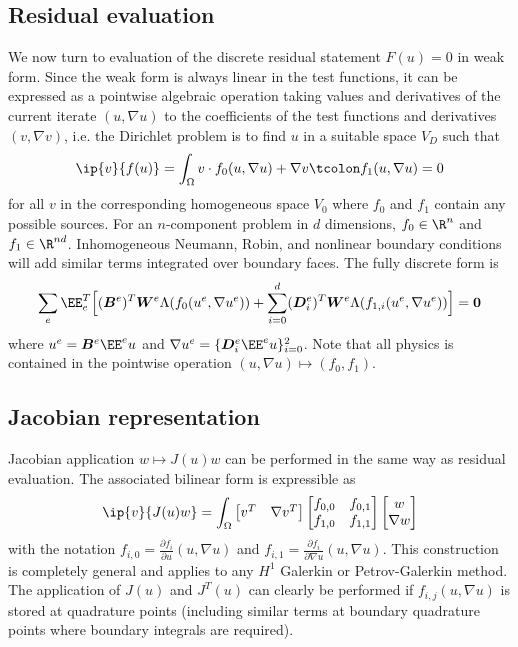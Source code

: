 \subsection{Residual evaluation}\label{sec:res-eval}
We now turn to evaluation of the discrete residual statement $F(u) = 0$ in weak form.  Since the weak form is always
linear in the test functions, it can be expressed as a pointwise algebraic operation taking values and derivatives of
the current iterate $(u,\nabla u)$ to the coefficients of the test functions and derivatives $(v,\nabla v)$, i.e. the
Dirichlet problem is to find $u$ in a suitable space $V_D$ such that
\begin{equation}\label{eq:feval}
  \ip{v}{f(u)} = \int_\Omega v \cdot f_0(u,\nabla u) + \nabla v \tcolon f_1(u,\nabla u) = 0
\end{equation}
for all $v$ in the corresponding homogeneous space $V_0$ where $f_0$ and $f_1$ contain any possible sources.  For an
$n$-component problem in $d$ dimensions, $f_0 \in \R^n$ and $f_1 \in \R^{nd}$.  Inhomogeneous Neumann, Robin, and
nonlinear boundary conditions will add similar terms integrated over boundary faces.  The fully discrete form is
\begin{equation}
  \label{eq:sum}
  \sum_e \EE_e^T \Big[ (\bm B^e)^T \bm W^e \Lambda(f_0(u^e,\nabla u^e))
  + \sum_{i=0}^d(\bm D_i^e)^T \bm W^e \Lambda(f_{1,i}(u^e,\nabla u^e)) \Big] = \bm 0
\end{equation}
where $u^e = \bm B^e \EE^e u$ and $\nabla u^e = \{\bm D_i^e \EE^e u\}_{i=0}^2$.  Note that all physics is contained in
the pointwise operation $(u,\nabla u) \mapsto (f_0,f_1)$.

\subsection{Jacobian representation}\label{sec:jac-rep}
Jacobian application $w \mapsto J(u) w$ can be performed in the same way as residual evaluation.  The associated
bilinear form is expressible as
\begin{equation}\label{eq:Jeval}
  \ip{v}{J(u) w} = \int_\Omega \begin{bmatrix} v^T & \nabla v^T \end{bmatrix}
  \begin{bmatrix} f_{0,0} & f_{0,1} \\ f_{1,0} & f_{1,1} \end{bmatrix} 
  \begin{bmatrix} w \\ \nabla w \end{bmatrix}
\end{equation}
with the notation $f_{i,0} = \frac{\partial f_i}{\partial u} (u,\nabla u)$ and $f_{i,1} = \frac{\partial f_i}{\partial
  \nabla u} (u,\nabla u)$.  This construction is completely general and applies to any $H^1$ Galerkin or Petrov-Galerkin
method.  The application of $J(u)$ and $J^T(u)$ can clearly be performed if $f_{i,j}(u,\nabla u)$ is stored at
quadrature points (including similar terms at boundary quadrature points where boundary integrals are required).

